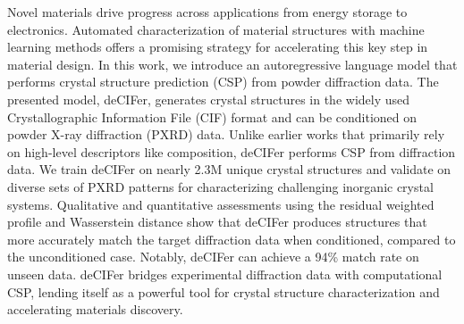 Novel materials drive progress across applications from energy storage to electronics. Automated characterization of material structures with machine learning methods offers a promising strategy for accelerating this key step in material design. In this work, we introduce an autoregressive language model that performs crystal structure prediction (CSP) from powder diffraction data. The presented model, deCIFer, generates crystal structures in the widely used Crystallographic Information File (CIF) format and can be conditioned on powder X-ray diffraction (PXRD) data. Unlike earlier works that primarily rely on high-level descriptors like composition, deCIFer performs CSP from diffraction data. We train deCIFer on nearly 2.3M unique crystal structures and validate on diverse sets of PXRD patterns for characterizing challenging inorganic crystal systems. Qualitative and quantitative assessments using the residual weighted profile and Wasserstein distance show that deCIFer produces structures that more accurately match the target diffraction data when conditioned, compared to the unconditioned case. Notably, deCIFer can achieve a 94\% match rate on unseen data. deCIFer bridges experimental diffraction data with computational CSP, lending itself as a powerful tool for crystal structure characterization and accelerating materials discovery.
